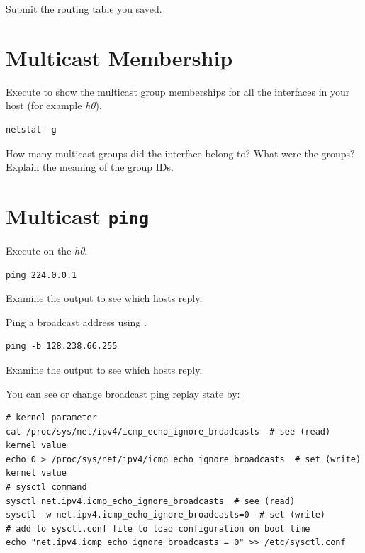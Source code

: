 \documentclass{../UTNetLab}
\begin{document}
\begin{report}
    \item Submit the routing table you saved.
\end{report}

\section{Multicast Membership}
Execute  to show the multicast group memberships for all the interfaces in your host (for example \textit{h0}).

\begin{lstlisting}
netstat -g
\end{lstlisting}

\begin{report}
    \item How many multicast groups did the interface belong to? What were the groups? Explain the meaning of the group IDs.
\end{report}

\section{Multicast \texttt{ping}}
Execute  on the \textit{h0}.

\begin{lstlisting}
ping 224.0.0.1
\end{lstlisting}
Examine the  output to see which hosts reply.

Ping a broadcast address using .

\begin{lstlisting}
ping -b 128.238.66.255
\end{lstlisting}
Examine the  output to see which hosts reply.

You can see or change broadcast ping replay state by:
\begin{lstlisting}[emph=eth0]
# kernel parameter
cat /proc/sys/net/ipv4/icmp_echo_ignore_broadcasts  # see (read) kernel value
echo 0 > /proc/sys/net/ipv4/icmp_echo_ignore_broadcasts  # set (write) kernel value
# sysctl command
sysctl net.ipv4.icmp_echo_ignore_broadcasts  # see (read)
sysctl -w net.ipv4.icmp_echo_ignore_broadcasts=0  # set (write)
# add to sysctl.conf file to load configuration on boot time
echo "net.ipv4.icmp_echo_ignore_broadcasts = 0" >> /etc/sysctl.conf
\end{lstlisting}
\end{document}
